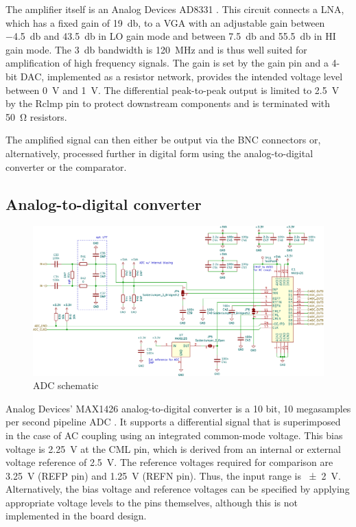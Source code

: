\documentclass[
	english,
	ruledheaders=section, %
	class=report,%
	thesis={type=Project Seminar Report},%
	accentcolor=TUDa-1d, %
	custommargins=false,%
	marginpar=false,%
	parskip=half-,%
	fontsize=11pt,%
]{tudapub}
\begin{document}
The amplifier itself is an Analog Devices AD8331 \autocite{analogdevicesUltralowNoiseVGAs2016}. This circuit connects a \gls{LNA}, which has a fixed gain of \SI{19}{\decibel}, to a \gls{VGA} with an adjustable gain between \SI{-4.5}{\decibel} and \SI{43.5}{\decibel} in LO gain mode and between \SI{7.5}{\decibel} and \SI{55.5}{\decibel} in HI gain mode. The \SI{3}{\decibel} bandwidth is \SI{120}{\mega\hertz} and is thus well suited for amplification of high frequency signals. The gain is set by the gain pin and a 4-bit \gls{DAC}, implemented as a resistor network, provides the intended voltage level between \SI{0}{\volt} and \SI{1}{\volt}. The differential peak-to-peak output is limited to \SI{2.5}{\volt} by the Rclmp pin to protect downstream components and is terminated with \SI{50}{\ohm} resistors.

The amplified signal can then either be output via the BNC connectors or, alternatively, processed further in digital form using the analog-to-digital converter or the comparator.

\subsection{Analog-to-digital converter}

\begin{figure}[H]
    \centering
    \includegraphics[width=1.0\columnwidth]{schematics/sch_adc.pdf}
    \caption{\gls{ADC} schematic}
    \label{sch:adc}
\end{figure}
Analog Devices' MAX1426 analog-to-digital converter is a 10 bit, 10 megasamples per second pipeline \gls{ADC} \autocite{analogdevices10Bit10MspsADC2011}. It supports a differential signal that is superimposed in the case of AC coupling using an integrated common-mode voltage. This bias voltage is \SI{2.25}{\volt} at the CML pin, which is derived from an internal or external voltage reference of \SI{2.5}{\volt}. The reference voltages required for comparison are \SI{3.25}{\volt} (REFP pin) and \SI{1.25}{\volt} (REFN pin). Thus, the input range is \SI{\pm2}{\volt}. Alternatively, the bias voltage and reference voltages can be specified by applying appropriate voltage levels to the pins themselves, although this is not implemented in the board design.
\end{document}
